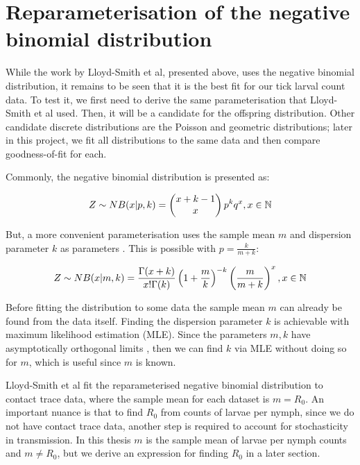 \documentclass{article}
\begin{document}
\newpage

\section{Reparameterisation of the negative binomial distribution}

While the work by Lloyd-Smith et al, presented above, uses the negative binomial distribution, it remains to be seen that it is the best fit for our tick larval count data. To test it, we first need to derive the same parameterisation that Lloyd-Smith et al used. Then, it will be a candidate for the offspring distribution. Other candidate discrete distributions are the Poisson and geometric distributions; later in this project, we fit all distributions to the same data and then compare goodness-of-fit for each.

Commonly, the negative binomial distribution is presented as:

\begin{equation}\label{NegBinom}
	Z \sim NB(x | p, k) = \left(\begin{matrix}x+k-1 \\ x \end{matrix}\right) \space p^k q^x, \space \space \space \space \space x \in \mathbb{N}
\end{equation}

But, a more convenient parameterisation uses the sample mean $ m $ and dispersion parameter $ k $ as parameters \cite{Rice2007}. This is possible with $ p = \frac{k}{m+k} $:

\begin{equation}\label{NegBinomReparam}
    Z \sim NB(x | m, k) = \frac{\Gamma(x+k)}{x!\Gamma(k)} \space \left(1+\frac{m}{k}\right)^{-k} \space \left(\frac{m}{m+k}\right)^x, \space \space \space \space \space x \in \mathbb{N}
\end{equation}

Before fitting the distribution to some data the sample mean $ m $ can already be found from the data itself. Finding the dispersion parameter $ k $ is achievable with maximum likelihood estimation (MLE). Since the parameters $ m, k $ have asymptotically orthogonal limits \cite{LloydSmith2005}, then we can find $ k $ via MLE without doing so for $ m $, which is useful since $ m $ is known.

Lloyd-Smith et al fit the reparameterised negative binomial distribution to contact trace data, where the sample mean for each dataset is $ m=R_0 $. An important nuance is that to find $ R_0 $ from counts of larvae per nymph, since we do not have contact trace data, another step is required to account for stochasticity in transmission. In this thesis $ m $ is the sample mean of larvae per nymph counts and $ m \ne R_0 $, but we derive an expression for finding $ R_0 $ in a later section.
\end{document}
